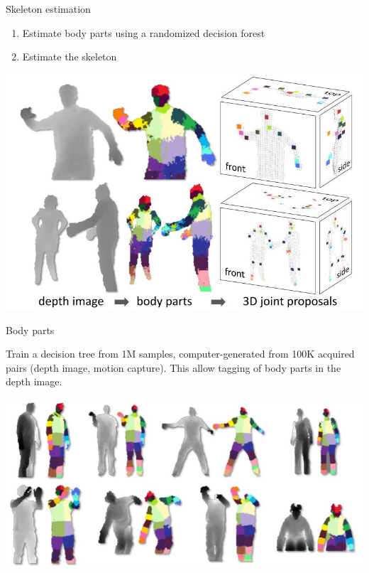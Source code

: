 \documentclass[compress]{beamer}
\begin{document}
{

\begin{frame}{Skeleton estimation}
    \begin{enumerate}
        \item Estimate body parts using a randomized decision forest
        \item Estimate the skeleton
    \end{enumerate}
    \begin{center}
        \includegraphics[width=0.8\linewidth]{skeleton/skeleton_estimation}
    \end{center}
\end{frame}
}

{

\begin{frame}{Body parts}

    {\Medium Train a decision tree} from \approx 1M samples, computer-generated from
    \approx 100K acquired pairs (depth image, motion capture). This allow
    {\Medium tagging} of body parts in the depth image.

    \begin{center}
        \includegraphics[width=0.8\linewidth]{skeleton/training}
    \end{center}
\end{frame}
}
\end{document}
